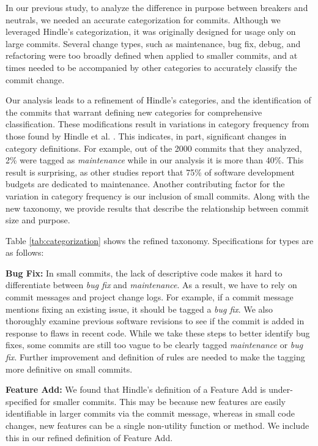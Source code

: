 In our previous study, to analyze the difference in purpose between breakers and neutrals, we needed an accurate categorization for commits.
Although we leveraged Hindle's categorization, it was originally designed for usage only on large commits.
Several change types, such as maintenance, bug fix, debug, and refactoring were too broadly defined when applied to smaller commits, and at times needed to be accompanied by other categories to accurately classify the commit change.

Our analysis leads to a refinement of Hindle's categories, and the identification of the commits that warrant defining new categories for comprehensive classification.
These modifications result in variations in category frequency from those found by Hindle et al. \cite{Hindle_cate}. This indicates, in part, significant changes in category definitions. For example, out of the 2000 commits that they analyzed, 2\% were tagged as \textit{maintenance} while in our analysis it is more than 40\%.
This result is surprising, as other studies  \cite{dodaro2015government,redman2008weapon,koskinen2009software} report that 75\% of software development budgets are dedicated to maintenance. Another contributing factor for the variation in category frequency is our inclusion of small commits. Along with the new taxonomy, we provide results that describe the relationship between commit size and purpose.

Table \ref{tab:categorization} shows the refined taxonomy.
Specifications for types are as follows:

\textbf{Bug Fix:} In small commits, the lack of descriptive code makes it hard to differentiate between \textit{bug fix} and \textit{maintenance}. 
As a result, we have to rely on commit messages and project change logs. 
For example, if a commit message mentions fixing an existing issue, it should be tagged a \textit{bug fix}. We also thoroughly examine previous software revisions to see if the commit is added in response to flaws in recent code.
While we take these steps to better identify bug fixes, some commits are still too vague to be clearly tagged \textit{maintenance} or \textit{bug fix}. 
Further improvement and definition of rules are needed to make the tagging more definitive on small commits.

\textbf{Feature Add:} We found that Hindle's definition of a Feature Add is under-specified for smaller commits.
This may be because new features are easily identifiable in larger commits via the commit message, whereas in small code changes, new features can be a single non-utility function or method. We include this in our refined definition of Feature Add.

